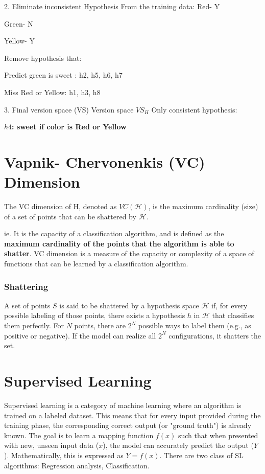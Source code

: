 \documentclass[12pt]{article}
\begin{document}
2. Eliminate inconsistent Hypothesis
From the training data:
Red- Y

Green- N

Yellow- Y

Remove hypothesis that:

Predict green is sweet : h2, h5, h6, h7

Miss Red or Yellow: h1, h3, h8

3. Final version space (VS)
Version space $VS_H$ Only consistent hypothesis:

\textbf{\boldmath$h4$: sweet if color is Red or Yellow}

\section{Vapnik- Chervonenkis (VC) Dimension}
\begin{framed}
  The VC dimension of H, denoted as $VC(\mathcal H)$, is the maximum cardinality (size) of a set of points that can be shattered by $\mathcal H$.
\end{framed}
ie. It is the capacity of a classification algorithm, and is defined as the \textbf{maximum cardinality of the points that the algorithm is able to shatter}.
VC dimension is a measure of the capacity or complexity of a space of functions that can be learned by a classification algorithm.

\subsubsection*{Shattering}
A set of points $S$ is said to be shattered by a hypothesis space $\mathcal H$ if, for every possible labeling of those points, there exists a hypothesis $h$ in $\mathcal H$ that classifies them perfectly.
For $N$ points, there are $2^N$ possible ways to label them (e.g., as positive or negative). If the model can realize all $2^N$ configurations, it shatters the set.

\section{Supervised Learning}
Supervised learning is a category of machine learning where an algorithm is trained on a labeled dataset. This means that for every input provided during the training phase, the corresponding correct output (or "ground truth") is already known. The goal is to learn a mapping function $f(x)$ such that when presented with new, unseen input data ($x$), the model can accurately predict the output ($Y$). Mathematically, this is expressed as $Y=f(x)$. There are two class of SL algorithms: Regression analysis, Classification.
\end{document}

